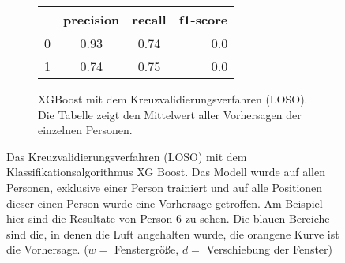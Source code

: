 \begin{figure}[H]
  \begin{subfigure}{1\textwidth}
      \begin{center}
          \begin{tabular}{ | l | c | c | r | }
            \hline
             & precision & recall & f1-score \\ \hline
            0 & 0.93 & 0.74 & 0.0 \\ \hline
            1 & 0.74 & 0.75 & 0.0 \\
            \hline
          \end{tabular}
      \end{center}
      \caption{XGBoost mit dem Kreuzvalidierungsverfahren (LOSO). Die Tabelle zeigt den Mittelwert aller Vorhersagen der einzelnen Personen.}
      \label{implementation:app:screenshots:user_studies_information}
  \end{subfigure}
    \caption{Das Kreuzvalidierungsverfahren (LOSO) mit dem Klassifikationsalgorithmus XG Boost. Das Modell wurde auf allen Personen, exklusive einer Person trainiert und auf alle Positionen dieser einen Person wurde eine Vorhersage getroffen. Am Beispiel hier sind die Resultate von Person 6 zu sehen. Die blauen Bereiche sind die, in denen die Luft angehalten wurde, die orangene Kurve ist die Vorhersage. ($w=$ Fenstergröße, $d=$ Verschiebung der Fenster)}
\label{evaluation:xgboost_loso:person6}
\end{figure}

